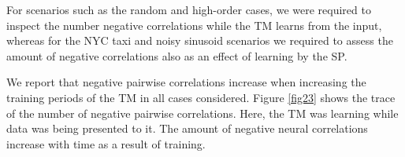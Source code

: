 \documentclass[11pt,letterpaper]{article}
\begin{document}
            For scenarios such as the random and high-order cases, we were required to
            inspect the number negative correlations while the TM learns from the input,
            whereas for the NYC taxi and noisy sinusoid scenarios we required to
            assess the amount of negative correlations also as an effect of learning
            by the SP.
            
            We report that negative pairwise correlations increase when increasing the
            training periods of the TM in all cases considered.
            Figure \ref{fig23} shows the trace of the number of negative pairwise
            correlations.
            Here, the TM was learning while data was being presented to it.
            The amount of negative neural correlations increase with time as a result
            of training.
\end{document}
